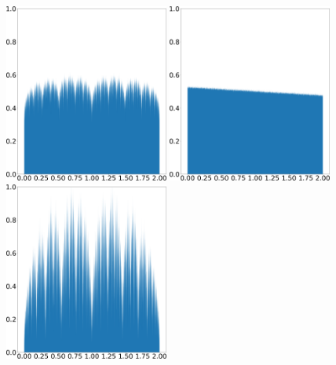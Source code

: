 \begin{figure}[H]
    \centering
    \includegraphics[width=0.48\textwidth]{figure/tent_pinched_shadow_density_0.05.png}
    \hspace{0.02\textwidth}
    \includegraphics[width=0.48\textwidth]{figure/tent_pinched_physical_density_0.05.png}
    \\ \vspace{0.02\textwidth}
    \includegraphics[width=0.48\textwidth]{figure/tent_pinched_shadow_density_0.2.png}
    \hspace{0.02\textwidth}

\end{figure}
